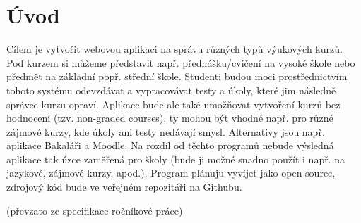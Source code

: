 \chapter{Úvod}


Cílem je vytvořit webovou aplikaci na správu různých typů výukových kurzů. Pod kurzem si můžeme představit např. přednášku/cvičení na vysoké škole nebo předmět na základní popř. střední škole. Studenti budou moci prostřednictvím tohoto systému odevzdávat a vypracovávat testy a úkoly, které jim následně správce kurzu opraví. 
Aplikace bude ale také umožňovat vytvoření kurzů bez hodnocení (tzv. non-graded courses), ty mohou být vhodné např. pro různé zájmové kurzy, kde úkoly ani testy nedávají smysl. 
Alternativy jsou např. aplikace Bakaláři a Moodle. Na rozdíl od těchto programů nebude výsledná aplikace tak úzce zaměřená pro školy (bude ji možné snadno použít i např. na jazykové, zájmové kurzy, apod.).
Program plánuju vyvíjet jako open-source, zdrojový kód bude ve veřejném repozitáři na Githubu.

(převzato ze specifikace ročníkové práce)